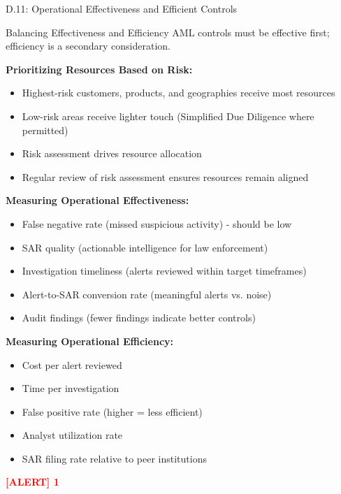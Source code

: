 \documentclass[11pt,a4paper]{beamer}
\newcommand{\redflag}[1]{\textcolor{red}{\textbf{[ALERT] 1}}}
\begin{document}
\begin{frame}{D.11: Operational Effectiveness and Efficient Controls}
	\begin{block}{Balancing Effectiveness and Efficiency}
		AML controls must be effective first; efficiency is a secondary consideration.
	\end{block}
	\textbf{Prioritizing Resources Based on Risk:}
	\begin{itemize}
		\item Highest-risk customers, products, and geographies receive most resources
		\item Low-risk areas receive lighter touch (Simplified Due Diligence where permitted)
		\item Risk assessment drives resource allocation
		\item Regular review of risk assessment ensures resources remain aligned
	\end{itemize}
	\textbf{Measuring Operational Effectiveness:}
	\begin{itemize}
		\item False negative rate (missed suspicious activity) - should be low
		\item SAR quality (actionable intelligence for law enforcement)
		\item Investigation timeliness (alerts reviewed within target timeframes)
		\item Alert-to-SAR conversion rate (meaningful alerts vs. noise)
		\item Audit findings (fewer findings indicate better controls)
	\end{itemize}
	\textbf{Measuring Operational Efficiency:}
	\begin{itemize}
		\item Cost per alert reviewed
		\item Time per investigation
		\item False positive rate (higher = less efficient)
		\item Analyst utilization rate
		\item SAR filing rate relative to peer institutions
	\end{itemize}
	\redflag{Efficiency improvements should never come at the cost of effectiveness.}
\end{frame}
\end{document}
